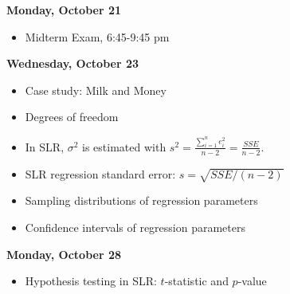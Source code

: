 \documentclass[11pt]{article}
\begin{document}
%
%

\vspace{5mm}
\noindent\textbf{\large Monday, October 21} 	


\begin{itemize}
\item Midterm Exam,  6:45-9:45 pm
\end{itemize}



\vspace{5mm}
\noindent\textbf{\large Wednesday, October 23} 	


\begin{itemize}
\item Case study: Milk and Money
\item Degrees of freedom
\item In SLR,   $\sigma^2$ is estimated with $s^2=\frac{\sum_{i=1}^n e_i^2}{n-2}=\frac{SSE}{n-2}$. 
\item SLR regression standard error: $s=\sqrt{SSE/(n-2)}$

\item Sampling distributions of regression parameters
\item Confidence intervals of regression parameters


\end{itemize}



%
\noindent\textbf{\large Monday, October 28} 	




\begin{itemize}
\item Hypothesis testing in SLR: $t$-statistic and $p$-value



\end{itemize}
\end{document}
